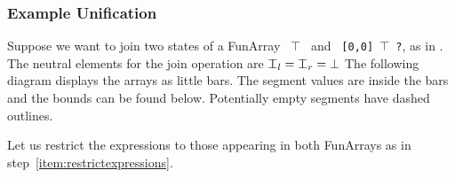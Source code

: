 \subsubsection{Example Unification}

Suppose we want to join two states of a FunArray \texttt{ $\top$ } and \texttt{ [0,0]  $\top$ ?}, as in \cite[example 8]{cousot2011}. The neutral elements for the join operation are $\nElement_l=\nElement_r=\bot$ The following diagram displays the arrays as little bars. The segment values are inside the bars and the bounds can be found below. Potentially empty segments have dashed outlines.

\vspace{0.2cm}
\begin{center}
\end{center}


\noindent Let us restrict the expressions to those appearing in both FunArrays as in step~\ref{item:restrictexpressions}.


